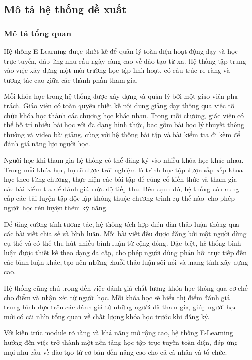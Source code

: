 \subsection{Mô tả hệ thống đề xuất}
\subsubsection{Mô tả tổng quan}
Hệ thống E-Learning được thiết kế để quản lý toàn diện hoạt động dạy và học trực tuyến, đáp ứng nhu cầu ngày càng cao về đào tạo từ xa. Hệ thống tập trung vào việc xây dựng một môi trường học tập linh hoạt, có cấu trúc rõ ràng và tương tác cao giữa các thành phần tham gia.

Mỗi khóa học trong hệ thống được xây dựng và quản lý bởi một giáo viên phụ trách. Giáo viên có toàn quyền thiết kế nội dung giảng dạy thông qua việc tổ chức khóa học thành các chương học khác nhau. Trong mỗi chương, giáo viên có thể bố trí nhiều bài học với đa dạng hình thức, bao gồm bài học lý thuyết thông thường và video bài giảng, cùng với hệ thống bài tập và bài kiểm tra đi kèm để đánh giá năng lực người học.

Người học khi tham gia hệ thống có thể đăng ký vào nhiều khóa học khác nhau. Trong mỗi khóa học, họ sẽ được trải nghiệm lộ trình học tập được sắp xếp khoa học theo từng chương, thực hiện các bài tập để củng cố kiến thức và tham gia các bài kiểm tra để đánh giá mức độ tiếp thu. Bên cạnh đó, hệ thống còn cung cấp các bài luyện tập độc lập không thuộc chương trình cụ thể nào, cho phép người học rèn luyện thêm kỹ năng.

Để tăng cường tính tương tác, hệ thống tích hợp diễn đàn thảo luận thông qua các bài viết chia sẻ và bình luận. Mỗi bài viết đều được đăng bởi một người dùng cụ thể và có thể thu hút nhiều bình luận từ cộng đồng. Đặc biệt, hệ thống bình luận được thiết kế theo dạng đa cấp, cho phép người dùng phản hồi trực tiếp đến các bình luận khác, tạo nên những chuỗi thảo luận sôi nổi và mang tính xây dựng cao.

Hệ thống cũng chú trọng đến việc đánh giá chất lượng khóa học thông qua cơ chế cho điểm và nhận xét từ người học. Mỗi khóa học sẽ hiển thị điểm đánh giá trung bình dựa trên các đánh giá từ những người đã tham gia, giúp người học mới có cái nhìn tổng quan về chất lượng khóa học trước khi đăng ký.

Với kiến trúc module rõ ràng và khả năng mở rộng cao, hệ thống E-Learning hướng đến việc trở thành một nền tảng học tập trực tuyến toàn diện, đáp ứng mọi nhu cầu về đào tạo từ cơ bản đến nâng cao cho cả cá nhân và tổ chức.

